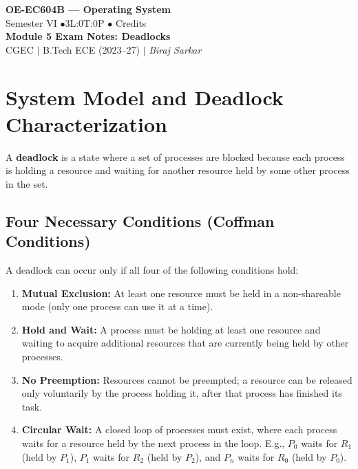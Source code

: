 \documentclass[12pt,a4paper]{article}
\begin{document}

\begin{center}
  {\LARGE\bfseries\color{myred} OE-EC604B --- Operating System}\\[5pt]
  {\normalsize\color{mydark} Semester VI \quad$\bullet$\quad 3L:0T:0P \quad$\bullet$ Credits}\\[3pt]
  {\normalsize\color{myteal}\textbf{Module 5 Exam Notes: Deadlocks}}\\[3pt]
  {\small\color{mydark} CGEC \;$|$\; B.Tech ECE (2023--27) \;$|$\; \textit{Biraj Sarkar}}
\end{center}
\vspace{2pt}
\noindent{\color{myred}\rule{\linewidth}{1.5pt}}
\vspace{2pt}

\hypersetup{linkcolor=mydark}
\tableofcontents
\hypersetup{linkcolor=myteal}
\newpage

\section{System Model and Deadlock Characterization}

A \textbf{deadlock} is a state where a set of processes are blocked because each process is holding a resource and waiting for another resource held by some other process in the set.

\subsection{Four Necessary Conditions (Coffman Conditions)}
A deadlock can occur only if all four of the following conditions hold:
\begin{enumerate}[leftmargin=*, itemsep=3pt]
  \item \textbf{Mutual Exclusion:} At least one resource must be held in a non-shareable mode (only one process can use it at a time).
  \item \textbf{Hold and Wait:} A process must be holding at least one resource and waiting to acquire additional resources that are currently being held by other processes.
  \item \textbf{No Preemption:} Resources cannot be preempted; a resource can be released only voluntarily by the process holding it, after that process has finished its task.
  \item \textbf{Circular Wait:} A closed loop of processes must exist, where each process waits for a resource held by the next process in the loop. E.g., $P_0$ waits for $R_1$ (held by $P_1$), $P_1$ waits for $R_2$ (held by $P_2$), and $P_n$ waits for $R_0$ (held by $P_0$).
\end{enumerate}
\end{document}
